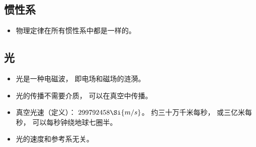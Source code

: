 
\begin{issues}
\issueDraft
\end{issues}


\subsection{惯性系}
\begin{itemize}
\item 物理定律在所有惯性系中都是一样的。
\end{itemize}

\subsection{光}
\begin{itemize}
\item 光是一种电磁波， 即电场和磁场的涟漪。
\item 光的传播不需要介质， 可以在真空中传播。
\item 真空光速（定义）： $299792458\Si{m/s}$。 约三十万千米每秒， 或三亿米每秒， 可以每秒钟绕地球七圈半。
\item 光的速度和参考系无关。
\end{itemize}
